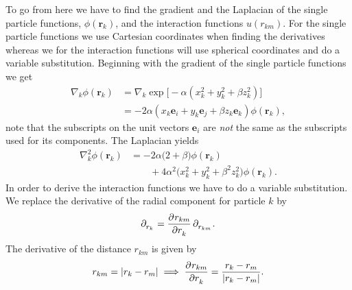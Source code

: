 \documentclass[
    a4paper, aps, twocolumn, floatfix, superscriptaddress]{revtex4-1}
\newcommand{\vf}{\mathbf}
\newcommand{\1}{\mathds{1}}
\newcommand{\tpl}[1]{\tensor{\partial}{_#1}} %
\begin{document}
            To go from here we have to find the gradient and the Laplacian of
            the single particle functions, $\phi(\vf{r}_k)$, and the interaction
            functions $u(r_{km})$. For the single particle functions we use
            Cartesian coordinates when finding the derivatives whereas we for
            the interaction functions will use spherical coordinates and do a
            variable substitution. Beginning with the gradient of the single
            particle functions we get
            \begin{align}
                \nabla_k\phi(\vf{r}_k)
                &=
                \nabla_k\exp\bigl[
                    -\alpha(x_k^2 + y_k^2 + \beta z_k^2)
                \bigr] \\
                &=
                -2\alpha
                (x_k\vf{e}_i + y_k\vf{e}_j + \beta z_k\vf{e}_k)
                \phi(\vf{r}_k),
            \end{align}
            note that the subscripts on the unit vectors $\vf{e}_i$ are
            \textit{not} the same as the subscripts used for its components. The
            Laplacian yields
            \begin{align}
                \nabla_k^2\phi(\vf{r}_k)
                &=
                -2\alpha
                \big(
                    2 + \beta
                \bigr)
                \phi(\vf{r}_k)
                \nonumber \\
                &\qquad
                + 4\alpha^2
                \bigl(
                    x_k^2 + y_k^2 + \beta^2z_k^2
                \bigr)
                \phi(\vf{r}_k).
            \end{align}
            In order to derive the interaction functions we have to do a
            variable substitution. We replace the derivative of the radial
            component for particle $k$ by
            \begin{align}
                \tpl{{r_k}}
                = \dpd[]{r_{km}}{r_k}\tpl{{r_{km}}}.
            \end{align}
            The derivative of the distance $r_{km}$ is given by
            \begin{gather}
                r_{km} = |r_k - r_m|
                \implies
                \dpd[]{r_{km}}{r_k}
                = \frac{r_k - r_m}{|r_k - r_m|}.
            \end{gather}
\end{document}
